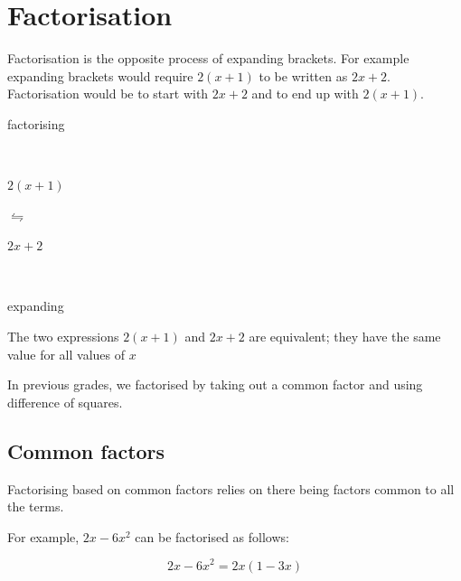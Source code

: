 \section{Factorisation}


Factorisation is the opposite process of expanding brackets. For example expanding brackets would require $2(x+1)$ to be written as $2x+2$. Factorisation would be to start with $2x+2$ and to end up with $2(x+1)$. 

\Identity{}
{
\begin{center}
\begin{small}\hspace{8pt}factorising\end{small}\\
\begin{Large}
$2(x+1)$ \begin{Huge} $\leftrightharpoons$ \end{Huge} $2x+2$
\end{Large}\\
\begin{small}\hspace{8pt}expanding\end{small}
\end{center}
}

The two expressions $2(x+1)$ and $2x+2$ are equivalent; they have the same value for all values of $x$


\par
In previous grades, we factorised by taking out a common factor and using difference of squares.\par 

\subsection*{Common factors}

Factorising based on common factors relies on there being factors common to all the terms. \par

For example, $2x-6{x}^{2}$ can be factorised as follows:\par 

\begin{equation*}
2x-6{x}^{2}=2x(1-3x)
\end{equation*}



